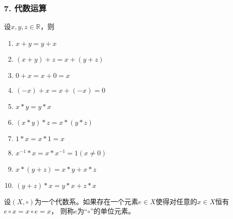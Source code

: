 \documentclass{beamer}
\begin{document}
\begin{CJK*}{UTF8}{gbsn}
\begin{frame}
  \frametitle{7. 代数运算}
  \begin{minipage}[t]{0.49\linewidth}
  \begin{block}{}
    设$x, y, z \in \mathbb{R}$，则
   \begin{enumerate}
   \item   $x + y = y + x$
   \item   $(x + y) + z = x + (y + z)$
   \item   $0 + x = x + 0 = x$
   \item   $(-x) + x = x + (-x) = 0$
   \item   $x * y = y * x$
   \item   $(x * y) * z = x * (y *z)$
   \item   $1 * x = x * 1 = x$
   \item   $x^{-1} * x = x * x^{-1} = 1(x\neq 0)$
   \item   $x* (y + z) = x * y + x * z$
   \item   $(y + z) * x = y * x + z * x$
    \end{enumerate}
  \end{block}\pause
\end{minipage}
\begin{minipage}[t]{0.49\linewidth}
  \begin{Def}
    设$(X, \circ)$为一个代数系。如果存在一个元素$e\in X$使得对任意的$x\in X$恒有$e\circ x = x \circ e = x$， 则称$e$为“$\circ$”的\alert{单位元素}。
  \end{Def}
\end{minipage}
\end{frame}


\end{CJK*}
\end{document}

